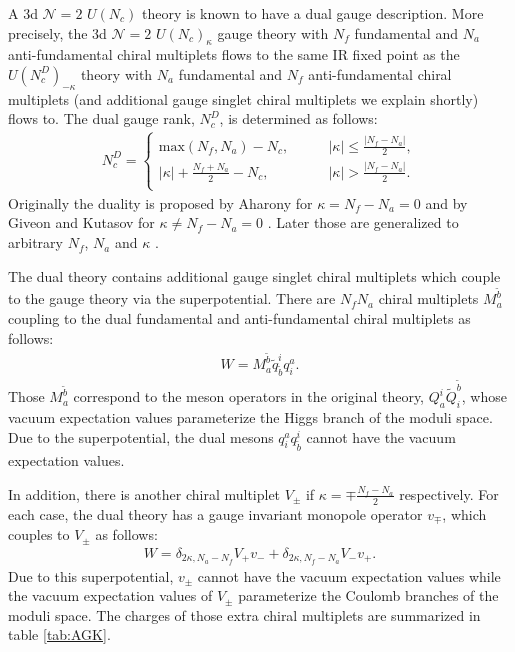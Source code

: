 \documentclass[a4paper,11pt]{article}
\begin{document}
A 3d $\mathcal N = 2$ $U(N_c)$ theory is known to have a dual gauge description. More precisely, the 3d $\mathcal N = 2$ $U(N_c)_\kappa$ gauge theory with $N_f$ fundamental and $N_a$ anti-fundamental chiral multiplets flows to the same IR fixed point as the $U(N_c^D)_{-\kappa}$ theory with $N_a$ fundamental and $N_f$ anti-fundamental chiral multiplets (and additional gauge singlet chiral multiplets we explain shortly) flows to. The dual gauge rank, $N_c^D$, is determined as follows:
\begin{align}
\label{eq:dual rank}
N_c^D = \left\{\begin{array}{cc}
\mathrm{max}(N_f,N_a)-N_c, \qquad & |\kappa| \leq \frac{|N_f-N_a|}{2}, \\
|\kappa|+\frac{N_f+N_a}{2}-N_c, \qquad & |\kappa| > \frac{|N_f-N_a|}{2}. \\
\end{array}\right.
\end{align}
Originally the duality is proposed by Aharony for $\kappa = N_f-N_a = 0$ \cite{Aharony:1997gp} and by Giveon and Kutasov for $\kappa \neq N_f-N_a = 0$ \cite{Giveon:2008zn}. Later those are generalized to arbitrary $N_f$, $N_a$ and $\kappa$ \cite{Benini:2011mf}.

The dual theory contains additional gauge singlet chiral multiplets which couple to the gauge theory via the superpotential. There are $N_f N_a$ chiral multiplets $M_a^{\tilde b}$ coupling to the dual fundamental and anti-fundamental chiral multiplets as follows:
\begin{align}
W = M_a^{\tilde b} \tilde q^i_{\tilde b} q^a_i.
\end{align}
Those $M_a^{\tilde b}$ correspond to the meson operators in the original theory, $Q_a^i \tilde Q_i^{\tilde b}$, whose vacuum expectation values parameterize the Higgs branch of the moduli space. Due to the superpotential, the dual mesons $q^a_i q^i_{\tilde b}$ cannot have the vacuum expectation values.

In addition, there is another chiral multiplet $V_\pm$ if $\kappa = \mp\frac{N_f-N_a}{2}$ respectively. For each case, the dual theory has a gauge invariant monopole operator $v_\mp$, which couples to $V_\pm$ as follows:
\begin{align}
W = \delta_{2 \kappa,N_a-N_f} V_+ v_- + \delta_{2 \kappa,N_f-N_a} V_- v_+.
\end{align}
Due to this superpotential, $v_\pm$ cannot have the vacuum expectation values while the vacuum expectation values of $V_\pm$ parameterize the Coulomb branches of the moduli space. The charges of those extra chiral multiplets are summarized in table \ref{tab:AGK}.
\end{document}
